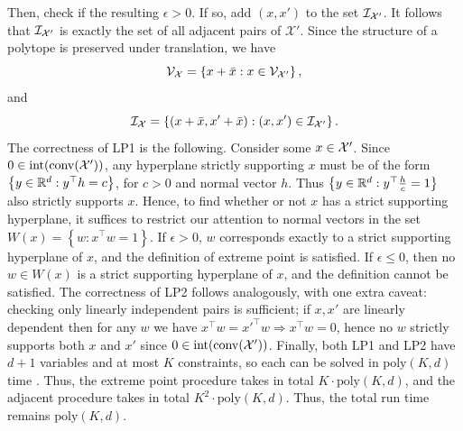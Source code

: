 Then, check if the resulting $\epsilon > 0$. If so, add $(x,x')$ to the set $\mathcal{I}_{\mathcal{X}'}$. It follows that $\mathcal{I}_{\mathcal{X}'}$ is exactly the set of all adjacent pairs of $\mathcal{X}'$. Since the structure of a polytope is preserved under translation, we have \begin{equation}
    \mathcal{V}_{\mathcal{X}} = \left\{x + \bar{x}:x \in \mathcal{V}_{\mathcal{X}'}\right\},
\end{equation} and \begin{equation}\mathcal{I}_{\mathcal{X}} = \left\{(x + \bar{x}, x' + \bar{x}):(x,x') \in \mathcal{I}_{\mathcal{X}'}\right\}. 
\end{equation} The correctness of LP1 is the following. Consider some $x \in \mathcal{X}'$. Since $0 \in \mathrm{int}(\operatorname*{conv}(\mathcal{X}'))$, any hyperplane strictly supporting $x$ must be of the form $\left\{y \in \mathbb{R}^d : y^\top h = c\right\}$, for $c > 0$ and normal vector $h$. Thus $\left\{y \in \mathbb{R}^d : y^\top \frac{h}{c} = 1\right\}$ also strictly supports $x$. Hence, to find whether or not $x$ has a strict supporting hyperplane, it suffices to restrict our attention to normal vectors in the set $W(x) = \left\{w:x^\top w =1\right\}$. If $\epsilon > 0$, $w$ corresponds exactly to a strict supporting hyperplane of $x$, and the definition of extreme point is satisfied. If $\epsilon \leq 0$, then no $w \in W(x)$ is a strict supporting hyperplane of $x$, and the definition cannot be satisfied. The correctness of LP2 follows analogously, with one extra caveat: checking only linearly independent pairs is sufficient; if $x,x'$ are linearly dependent then for any $w$ we have $x^\top w = x'^\top w\Rightarrow x^\top w =0$, hence no $w$ strictly supports both $x$ and $x'$ since $0 \in \mathrm{int}(\operatorname*{conv}(\mathcal{X}'))$. Finally, both LP1 and LP2 have $d+1$ variables and at most $K$ constraints, so each can be solved in $\text{poly}(K,d)$ time \citep{10.1145/800057.808695}. Thus, the extreme point procedure takes in total $K \cdot \text{poly}(K,d)$, and the adjacent procedure takes in total $K^2 \cdot \text{poly}(K,d)$. Thus, the total run time remains $\text{poly}(K,d)$.
